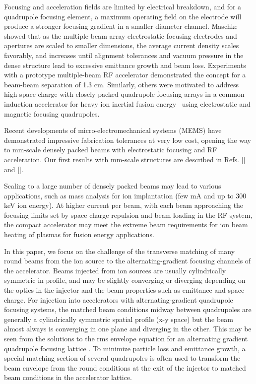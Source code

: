 \documentclass[%
 aip,
rsi,%
 amsmath,amssymb,
 reprint,%
]{revtex4-1}
\begin{document}
Focusing and acceleration fields are limited by electrical breakdown, and for a quadrupole focusing element, a maximum operating field on the electrode will produce a stronger focusing gradient in a smaller diameter channel.  Maschke \cite{Maschke_1979,Maschke_1979b} showed that as the multiple beam array electrostatic focusing electrodes and apertures are scaled to smaller dimensions, the average current density scales favorably, and increases until alignment tolerances and vacuum pressure in the dense structure lead to excessive emittance growth and beam loss.  Experiments with a prototype multiple-beam RF accelerator demonstrated the concept for a beam-beam separation of 1.3 cm. \cite{URBANUS1989508}  
Similarly, others were motivated to address high-space charge with closely packed quadrupole focusing arrays in a common induction accelerator for heavy ion inertial fusion energy~\cite{Bangerter2013} using electrostatic and magnetic focusing quadrupoles. 

Recent developments of micro-electromechanical systems (MEMS) have demonstrated impressive fabrication tolerances at very low cost, opening the way to mm-scale densely packed beams with electrostatic focusing and RF acceleration.  Our first results with mm-scale structures are described in Refs. [] and [].

Scaling to a large number of densely packed beams may lead to various  applications, such as mass analysis for ion implantation (few mA and up to 300 keV ion energy). \cite{Hamm12} At higher current per beam, with each beam approaching the focusing limits set by space charge repulsion and beam loading in the RF system, the compact accelerator may meet the extreme beam requirements for ion beam heating of plasmas for fusion energy applications. \cite{Sonato17}

In this paper, we focus on the challenge of the transverse matching of many round beams from the ion source to the alternating-gradient focusing channels of the accelerator.  Beams injected from ion sources are usually cylindrically symmetric in profile, and may be slightly converging or diverging depending on the optics in the injector and the beam properties such as emittance and space charge.  For injection into accelerators with alternating-gradient quadrupole focusing systems, the matched beam conditions midway between quadrupoles are generally a cylindrically symmetric spatial profile (x-y space) but the beam almost always is converging in one plane and diverging in the other.  This may be seen from the solutions to the rms envelope equation for an alternating gradient quadrupole focusing lattice \cite{Reiser1994}.  To minimize particle loss and emittance growth, a special matching section of several quadrupoles is often used to transform the beam envelope from the round conditions at the exit of the injector to matched beam conditions in the accelerator lattice.
\end{document}
